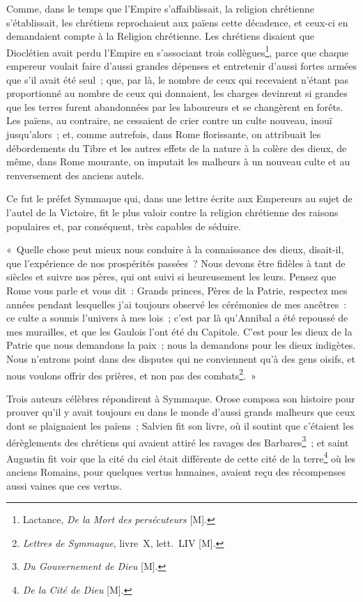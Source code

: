 \documentclass[french,twoside]{book} %
\newcommand\chaptercont{} %
\begin{document}
\chaptercont
\noindent Comme, dans le temps que l’Empire s’affaiblissait, la religion chrétienne s’établissait, les chrétiens reprochaient aux païens cette décadence, et ceux-ci en demandaient compte à la Religion chrétienne. Les chrétiens disaient que Dioclétien avait perdu l’Empire en s’associant trois collègues\footnote{Lactance, {\itshape De la Mort des persécuteurs} [M].}, parce que chaque empereur voulait faire d’aussi grandes dépenses et entretenir d’aussi fortes armées que s’il avait été seul ; que, par là, le nombre de ceux qui recevaient n’étant pas proportionné au nombre de ceux qui donnaient, les charges devinrent si grandes que les terres furent abandonnées par les laboureurs et se changèrent en forêts. Les païens, au contraire, ne cessaient de crier contre un culte nouveau, inouï jusqu’alors ; et, comme autrefois, dans Rome florissante, on attribuait les débordements du Tibre et les autres effets de la nature à la colère des dieux, de même, dans Rome mourante, on imputait les malheurs à un nouveau culte et au renversement des anciens autels.\par
Ce fut le préfet Symmaque qui, dans une lettre écrite aux Empereurs au sujet de l’autel de la Victoire, fit le plus valoir contre la religion chrétienne des raisons populaires et, par conséquent, très capables de séduire.\par
« Quelle chose peut mieux nous conduire à la connaissance des dieux, disait-il, que l’expérience de nos prospérités passées ? Nous devons être fidèles à tant de siècles et suivre nos pères, qui ont suivi si heureusement les leurs. Pensez que Rome vous parle et vous dit : Grands princes, Pères de la Patrie, respectez mes années pendant lesquelles j’ai toujours observé les cérémonies de mes ancêtres : ce culte a soumis l’univers à mes lois ; c’est par là qu’Annibal a été repoussé de mes murailles, et que les Gaulois l’ont été du Capitole. C’est pour les dieux de la Patrie que nous demandons la paix ; nous la demandons pour les dieux indigètes. Nous n’entrons point dans des disputes qui ne conviennent qu’à des gens oisifs, et nous voulons offrir des prières, et non pas des combats\footnote{{\itshape Lettres de Symmaque}, livre X, lett. LIV [M].}. »\par
Trois auteurs célèbres répondirent à Symmaque. Orose composa son histoire pour prouver qu’il y avait toujours eu dans le monde d’aussi grands malheurs que ceux dont se plaignaient les païens ; Salvien fit son livre, où il soutint que c’étaient les dérèglements des chrétiens qui avaient attiré les ravages des Barbares\footnote{{\itshape Du Gouvernement de Dieu} [M].} ; et saint Augustin fit voir que la cité du ciel était différente de cette cité de la terre\footnote{{\itshape De la Cité de Dieu} [M].} où les anciens Romains, pour quelques vertus humaines, avaient reçu des récompenses aussi vaines que ces vertus.\par
\end{document}
